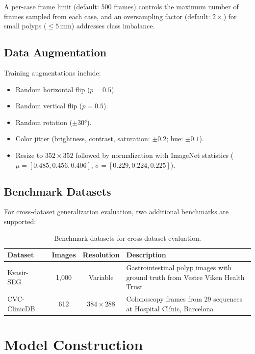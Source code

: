 A per-case frame limit (default: 500 frames) controls the maximum number of frames sampled from each case, and an oversampling factor (default: $2\times$) for small polyps ($\leq 5$\,mm) addresses class imbalance.

\subsection{Data Augmentation}
\label{sec:impl:augmentation}

Training augmentations include:
\begin{itemize}
	\item Random horizontal flip ($p = 0.5$).
	\item Random vertical flip ($p = 0.5$).
	\item Random rotation ($\pm 30°$).
	\item Color jitter (brightness, contrast, saturation: $\pm 0.2$; hue: $\pm 0.1$).
	\item Resize to $352 \times 352$ followed by normalization with ImageNet statistics ($\mu = [0.485, 0.456, 0.406]$, $\sigma = [0.229, 0.224, 0.225]$).
\end{itemize}

\subsection{Benchmark Datasets}
\label{sec:impl:benchmark}

For cross-dataset generalization evaluation, two additional benchmarks are supported:

\begin{table}[htbp]
	\caption{Benchmark datasets for cross-dataset evaluation.}
	\label{tab:benchmarks}
	\centering
	\begin{tabular}{lccp{6cm}}
		\toprule
		\textbf{Dataset} & \textbf{Images} & \textbf{Resolution} & \textbf{Description} \\
		\midrule
		Kvasir-SEG~\cite{jha2020kvasir} & 1{,}000 & Variable & Gastrointestinal polyp images with ground truth from Vestre Viken Health Trust \\
		CVC-ClinicDB~\cite{bernal2015cvc} & 612 & $384 \times 288$ & Colonoscopy frames from 29 sequences at Hospital Cl\'{i}nic, Barcelona \\
		\bottomrule
	\end{tabular}
\end{table}


\section{Model Construction}
\label{sec:impl:model}

